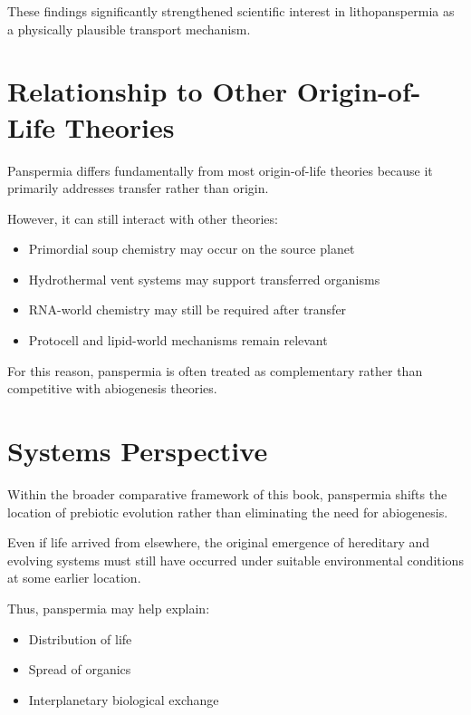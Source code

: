 \documentclass[
  oneside]{book}
\providecommand{\tightlist}{%
  \setlength{\itemsep}{0pt}\setlength{\parskip}{0pt}}
\begin{document}
These findings significantly strengthened scientific interest in lithopanspermia as a physically plausible transport mechanism.

\section{Relationship to Other Origin-of-Life Theories}\label{relationship-to-other-origin-of-life-theories-1}

Panspermia differs fundamentally from most origin-of-life theories because it primarily addresses transfer rather than origin.

However, it can still interact with other theories:

\begin{itemize}
\tightlist
\item
  Primordial soup chemistry may occur on the source planet
\item
  Hydrothermal vent systems may support transferred organisms
\item
  RNA-world chemistry may still be required after transfer
\item
  Protocell and lipid-world mechanisms remain relevant
\end{itemize}

For this reason, panspermia is often treated as complementary rather than competitive with abiogenesis theories.

\section{Systems Perspective}\label{systems-perspective-7}

Within the broader comparative framework of this book, panspermia shifts the location of prebiotic evolution rather than eliminating the need for abiogenesis.

Even if life arrived from elsewhere, the original emergence of hereditary and evolving systems must still have occurred under suitable environmental conditions at some earlier location.

Thus, panspermia may help explain:

\begin{itemize}
\tightlist
\item
  Distribution of life
\item
  Spread of organics
\item
  Interplanetary biological exchange
\end{itemize}
\end{document}
